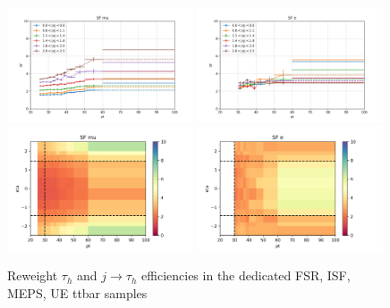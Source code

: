 \begin{figure}
    \centering
    \includegraphics[width=0.49\textwidth]{appendices/qcdSF/figures/123j1b/SF_mu_1d.png}
    \includegraphics[width=0.49\textwidth]{appendices/qcdSF/figures/123j1b/SF_e_1d.png}
    \includegraphics[width=0.49\textwidth]{appendices/qcdSF/figures/123j1b/SF_mu_2d.png}
    \includegraphics[width=0.49\textwidth]{appendices/qcdSF/figures/123j1b/SF_e_2d.png}

    \caption{Reweight $\tau_h$ and $j \to \tau_h$ efficiencies in the dedicated FSR, ISF, MEPS, UE ttbar samples}
    \label{fig:appendix:123j1b}
\end{figure}



